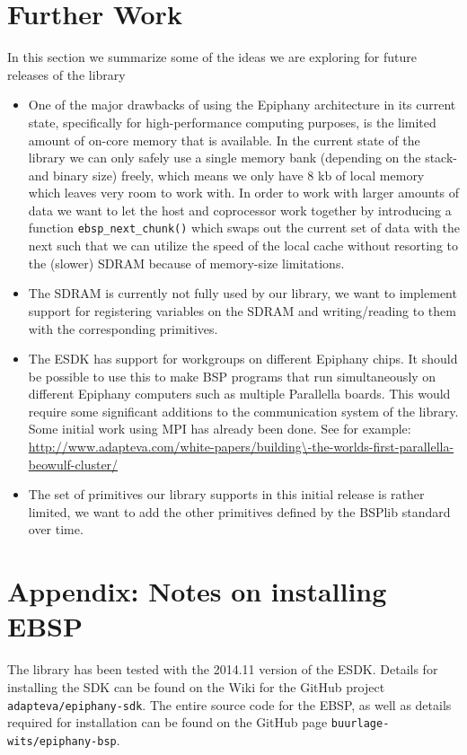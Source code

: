 \documentclass[fleqn]{article}
\renewcommand{\(}{\left(}
\renewcommand{\)}{\right)}
\begin{document}
\section{Further Work}

In this section we summarize some of the ideas we are exploring for future releases of the library

\begin{itemize}
\item One of the major drawbacks of using the Epiphany architecture in its current state, specifically for high-performance computing purposes, is the limited amount of on-core memory that is available. In the current state of the library we can only safely use a single memory bank (depending on the stack- and binary size) freely, which means we only have 8 kb of local memory which leaves very room to work with. In order to work with larger amounts of data we want to let the host and coprocessor work together by introducing a function \verb.ebsp_next_chunk(). which swaps out the current set of data with the next such that we can utilize the speed of the local cache without resorting to the (slower) SDRAM because of memory-size limitations.
\item The SDRAM is currently not fully used by our library, we want to implement support for registering variables on the SDRAM and writing/reading to them with the corresponding primitives.
\item The ESDK has support for workgroups on different Epiphany chips. It should be possible to use this to make BSP programs that run simultaneously on different Epiphany computers such as multiple Parallella boards. This would require some significant additions to the communication system of the library. Some initial work using MPI has already been done. See for example: \url{http://www.adapteva.com/white-papers/building\-the-worlds-first-parallella-beowulf-cluster/}
\item The set of primitives our library supports in this initial release is rather limited, we want to add the other primitives defined by the BSPlib standard over time.
\end{itemize}


\section*{Appendix: Notes on installing EBSP}

The library has been tested with the 2014.11 version of the ESDK. Details for installing the SDK can be found on the Wiki for the GitHub project \verb.adapteva/epiphany-sdk.. The entire source code for the EBSP, as well as details required for installation can be found on the GitHub page \verb.buurlage-wits/epiphany-bsp..
\end{document}
